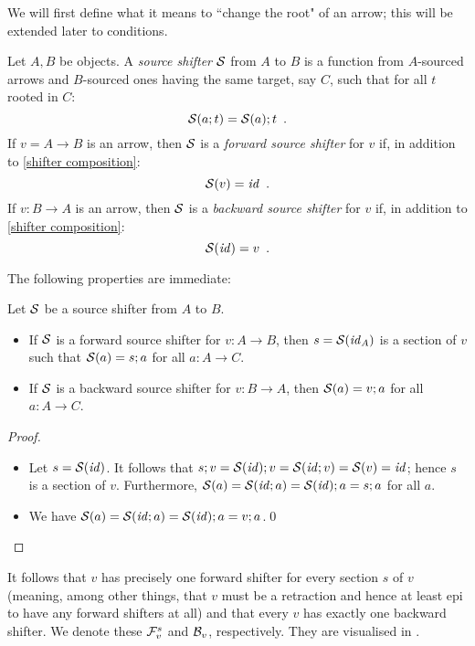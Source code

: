 We will first define what it means to ``change the root" of an arrow; this will be extended later to conditions.
%
\begin{definition}
Let $A,B$ be objects. A \emph{source shifter} $\mathcal{S}$ from $A$ to $B$ is a function from $A$-sourced arrows and $B$-sourced ones having the same target, say $C$, such that for all $t$ rooted in $C$:
%
\begin{equation}\eqlabel{shifter composition}
\cS(a;t) = \cS(a);t \enspace.
\end{equation}
%
If $v=A\to B$ is an arrow, then $\mathcal{S}$ is a \emph{forward source shifter} for $v$ if, in addition to \eqref{shifter composition}:
%
\begin{equation}\eqlabel{forward condition}
\cS(v) = \id \enspace.
\end{equation}
%
If $v:B\to A$ is an arrow, then $\mathcal{S}$ is a \emph{backward source shifter} for $v$ if, in addition to \eqref{shifter composition}:
%
\begin{equation}\eqlabel{backward condition}
\cS(\id) = v \enspace.
\end{equation}
\end{definition}
%
The following properties are immediate:
%
\begin{proposition}
Let $\mathcal{S}$ be a source shifter from $A$ to $B$.
\begin{itemize}
\item If $\mathcal{S}$ is a forward source shifter for $v:A\to B$, then $s=\mathcal{S}(\mathit{id}_A)$ is a section of $v$ such that $\mathcal{S}(a)=s;a$ for all $a:A\to C$.
\item If $\mathcal{S}$ is a backward source shifter for $v:B\to A$, then $\mathcal{S}(a)=v;a$ for all $a:A\to C$.
\end{itemize}
\end{proposition}
%
\begin{proof}~
\begin{itemize}
\item Let $s=\mathcal{S}(\mathit{id})$. It follows that $s;v=\mathcal{S}(\mathit{id});v=\mathcal{S}(\mathit{id};v)=\mathcal{S}(v)=\mathit{id}$; hence $s$ is a section of $v$. Furthermore, $\mathcal{S}(a)=\mathcal{S}(\mathit{id};a)=\mathcal{S}(\mathit{id});a=s;a$ for all $a$.
\item We have $\mathcal{S}(a)=\mathcal{S}(\mathit{id};a)=\mathcal{S}(\mathit{id});a=v;a$.\qed
\end{itemize}
\end{proof}
%
It follows that $v$ has precisely one forward shifter for every section $s$ of $v$ (meaning, among other things, that $v$ must be a retraction and hence at least epi to have any forward shifters at all) and that every $v$ has exactly one backward shifter. We denote these $\mathcal{F}_v^s$ and $\mathcal{B}_v$, respectively. They are visualised in .

